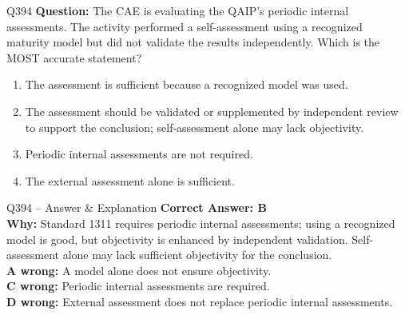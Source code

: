 \documentclass[aspectratio=169,10pt]{beamer}
\begin{document}
	\begin{frame}[t]{Q394}
		\small
		\textbf{Question:} The CAE is evaluating the QAIP's periodic internal assessments. The activity performed a self-assessment using a recognized maturity model but did not validate the results independently. Which is the MOST accurate statement?
		\begin{enumerate}[label=\Alph*.,itemsep=1pt,topsep=2pt]
			\item The assessment is sufficient because a recognized model was used.
			\item The assessment should be validated or supplemented by independent review to support the conclusion; self-assessment alone may lack objectivity.
			\item Periodic internal assessments are not required.
			\item The external assessment alone is sufficient.
		\end{enumerate}
	\end{frame}
	
	\begin{frame}[t]{Q394 -- Answer \& Explanation}
		\small
		\textbf{Correct Answer: B} \\[4pt]
		\textbf{Why:} Standard 1311 requires periodic internal assessments; using a recognized model is good, but objectivity is enhanced by independent validation. Self-assessment alone may lack sufficient objectivity for the conclusion. \\[4pt]
		\textbf{A wrong:} A model alone does not ensure objectivity. \\[2pt]
		\textbf{C wrong:} Periodic internal assessments are required. \\[2pt]
		\textbf{D wrong:} External assessment does not replace periodic internal assessments.
	\end{frame}
	
\end{document}
